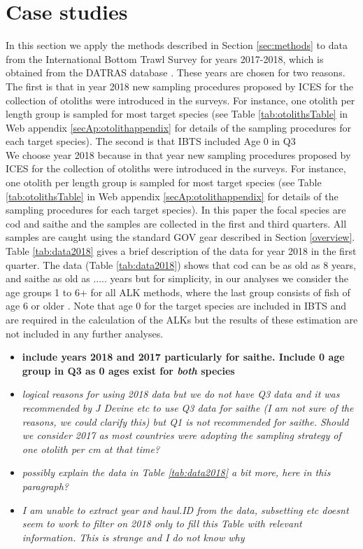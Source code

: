 \documentclass[a4paper 12pt]{article}
\numberwithin{equation}{section}
\begin{document}
\section{Case studies}
\label{sec:data}
In this section we apply the methods described in Section \ref{sec:methods} to data from the International Bottom Trawl Survey for years 2017-2018, which is obtained from the DATRAS database \citep{datras}. These years are chosen for two reasons. The first is that in year 2018 new sampling procedures proposed by ICES for the collection of otoliths were introduced in the surveys. For instance, one otolith per length group is sampled for most target species (see Table \ref{tab:otolithsTable} in Web appendix \ref{secAp:otolithappendix} for details of the sampling procedures for each target species). The second is that IBTS included Age 0 in Q3 \\



We choose year 2018 because in that year new sampling procedures proposed by ICES for the collection of otoliths were introduced in the surveys. For instance, one otolith per length group is sampled for most target species (see Table \ref{tab:otolithsTable} in Web appendix \ref{secAp:otolithappendix} for details of the sampling procedures for each target species). In this paper the focal species are cod and saithe and the samples are collected in the first and third quarters. All samples are caught using the standard GOV gear described in Section \ref{overview}. Table \ref{tab:data2018} gives a brief description of the data for year 2018 in the first quarter.  The data (Table \ref{tab:data2018}) shows that cod can be as old as 8 years, and saithe as old as ..... years but for simplicity, in our analyses we consider the age groups 1 to 6+ for all ALK methods, where the last group consists of fish of age 6 or older . Note that age 0 for the target species are included in IBTS and are required in the calculation of the ALKs but the results of these estimation are not included in any further analyses.

\begin{itemize}
\item {\bf include years 2018 and 2017 particularly for saithe. Include 0 age group  in Q3 as 0 ages exist for \textit{both} species}
\item \emph{logical reasons for using 2018 data but we do not have Q3 data and it was recommended by J Devine etc to use Q3 data for saithe (I am not sure of the reasons, we could clarify this) but Q1 is not recommended for saithe. Should we consider 2017 as most countries were adopting the sampling strategy of one otolith per cm at that time?}
\item \emph{possibly explain the data in Table \ref{tab:data2018} a bit more, here in this paragraph?}
\item \emph{I am unable to extract year and haul.ID from the data, subsetting etc doesnt seem to work to filter on 2018 only to fill this Table with relevant information. This is strange and I do not know why}
\end{itemize}
\end{document}
